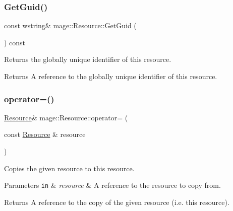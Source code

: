 \subsubsection{\texorpdfstring{Get\+Guid()}{GetGuid()}}
{\footnotesize\ttfamily const wstring\& mage\+::\+Resource\+::\+Get\+Guid (\begin{DoxyParamCaption}{ }\end{DoxyParamCaption}) const}

Returns the globally unique identifier of this resource.

\begin{DoxyReturn}{Returns}
A reference to the globally unique identifier of this resource. 
\end{DoxyReturn}
\hypertarget{classmage_1_1_resource_ad8fa57f37eb253b90d18d33383b12875}{}\label{classmage_1_1_resource_ad8fa57f37eb253b90d18d33383b12875} 
\subsubsection{\texorpdfstring{operator=()}{operator=()}\hspace{0.1cm}{\footnotesize\ttfamily [1/2]}}
{\footnotesize\ttfamily \hyperlink{classmage_1_1_resource}{Resource}\& mage\+::\+Resource\+::operator= (\begin{DoxyParamCaption}\item[{const \hyperlink{classmage_1_1_resource}{Resource} \&}]{resource }\end{DoxyParamCaption})\hspace{0.3cm}{\ttfamily [delete]}}

Copies the given resource to this resource.


\begin{DoxyParams}[1]{Parameters}
\mbox{\tt in}  & {\em resource} & A reference to the resource to copy from. \\
\hline
\end{DoxyParams}
\begin{DoxyReturn}{Returns}
A reference to the copy of the given resource (i.\+e. this resource). 
\end{DoxyReturn}
\hypertarget{classmage_1_1_resource_a5d087980bb8fb1cd7d96c22d9e0eb519}{}\label{classmage_1_1_resource_a5d087980bb8fb1cd7d96c22d9e0eb519} 
